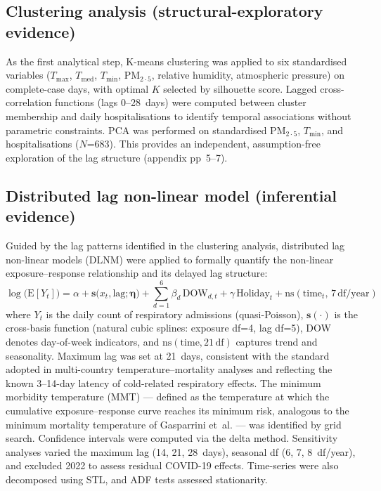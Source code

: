 \documentclass[review,number]{elsarticle}
\begin{document}
\subsection{Clustering analysis (structural-exploratory evidence)}

As the first analytical step, K-means
clustering\cite{MacQueen1967} was applied to six standardised variables
($T_\mathrm{max}$, $T_\mathrm{med}$, $T_\mathrm{min}$,
$\text{PM}_{2{\cdot}5}$, relative humidity, atmospheric pressure) on
complete-case days, with optimal $K$ selected by silhouette
score.\cite{Rousseeuw1987} Lagged cross-correlation functions (lags
0--28~days) were computed between cluster membership and daily
hospitalisations to identify temporal associations without
parametric constraints. PCA was performed on standardised
$\text{PM}_{2{\cdot}5}$, $T_\mathrm{min}$, and hospitalisations ($N$=683).
This provides an independent, assumption-free exploration of the
lag structure (appendix pp~5--7).

\subsection{Distributed lag non-linear model (inferential evidence)}
\label{sec:dlnm}

Guided by the lag patterns identified in the clustering analysis,
distributed lag non-linear models
(DLNM)\cite{Gasparrini2010,Gasparrini2011} were applied to formally
quantify the non-linear exposure--response relationship and its
delayed lag structure:
%
\begin{equation}
  \log\!\big(\mathrm{E}[Y_t]\big) = \alpha
    + \mathbf{s}\bigl(x_t, \mathrm{lag}; \boldsymbol{\eta}\bigr)
    + \sum_{d=1}^{6} \beta_d \,\mathrm{DOW}_{d,t}
    + \gamma \,\mathrm{Holiday}_t
    + \mathrm{ns}(\mathrm{time}_t,\, 7\,\mathrm{df/year})
  \label{eq:dlnm}
\end{equation}
%
where $Y_t$ is the daily count of respiratory admissions (quasi-Poisson),
$\mathbf{s}(\cdot)$ is the cross-basis function (natural cubic splines:
exposure df=4, lag df=5), DOW denotes day-of-week indicators, and
$\mathrm{ns}(\mathrm{time}, 21\,\mathrm{df})$ captures trend and
seasonality. Maximum lag was set at 21~days, consistent with the
standard adopted in multi-country temperature--mortality
analyses\cite{Gasparrini2015} and reflecting the known 3--14-day
latency of cold-related respiratory
effects.\cite{Linares2025,Cheng2024} The minimum morbidity temperature
(MMT) --- defined as the temperature at which the cumulative
exposure--response curve reaches its minimum risk, analogous to the
minimum mortality temperature of Gasparrini
et~al.\cite{Gasparrini2015} --- was identified by grid search.
Confidence intervals were computed via the delta method. Sensitivity
analyses varied the maximum lag (14, 21, 28~days), seasonal df
(6, 7, 8~df/year), and excluded 2022 to assess residual COVID-19
effects. Time-series were also
decomposed using STL, and ADF tests assessed stationarity.
\end{document}
